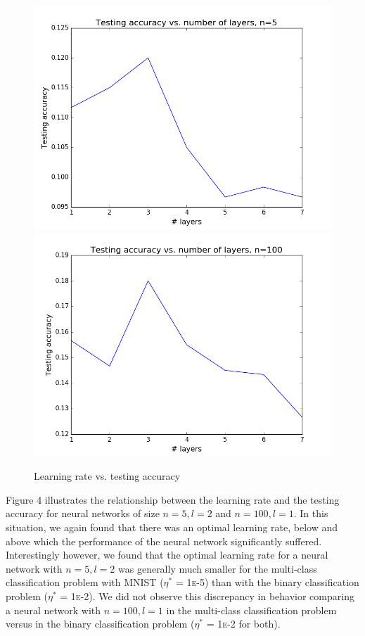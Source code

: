 \documentclass{article}
\begin{document}
\begin{figure}[width=\linewidth]
\centering
\begin{multicols}{2}
  \includegraphics[width=1.2\linewidth]{code/P1/accuracy_vs_layers,mnist,n5.png}
  \includegraphics[width=1.2\linewidth]{code/P1/accuracy_vs_layers,mnist,n100.png}
\end{multicols}
\caption{Learning rate vs. testing accuracy}
\end{figure}

Figure 4 illustrates the relationship between the learning rate and the testing accuracy for neural networks of size $n=5,l=2$ and $n=100,l=1$. In this situation, we again found that there was an optimal learning rate, below and above which the performance of the neural network significantly suffered. Interestingly however, we found that the optimal learning rate for a neural network with $n=5, l=2$ was generally much smaller for the multi-class classification problem with MNIST ($\eta^*$ = 1\textsc{e}-5) than with the binary classification problem ($\eta^*$ = 1\textsc{e}-2). We did not observe this discrepancy in behavior comparing a neural network with $n=100, l=1$ in the multi-class classification problem versus in the binary classification problem ($\eta^*$ = 1\textsc{e}-2 for both).
\end{document}
